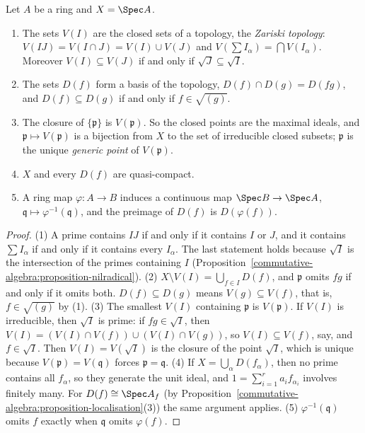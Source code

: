 \begin{proposition}\label{schemes:proposition-spec-topology}
Let $A$ be a ring and $X = \Spec A$.
\begin{enumerate}
\item The sets $V(I)$ are the closed sets of a topology, the \emph{Zariski topology}: $V(IJ) = V(I \cap J) = V(I) \cup V(J)$ and
$V(\sum I_\alpha) = \bigcap V(I_\alpha)$. Moreover $V(I) \subseteq V(J)$ if and only if $\sqrt J \subseteq \sqrt I$.
\item The sets $D(f)$ form a basis of the topology, $D(f) \cap D(g) = D(fg)$, and $D(f) \subseteq D(g)$ if and only if $f \in \sqrt{(g)}$.
\item The closure of $\{\mathfrak{p}\}$ is $V(\mathfrak{p})$. So the closed points are the maximal ideals, and $\mathfrak{p} \mapsto V(\mathfrak{p})$ is a bijection
from $X$ to the set of irreducible closed subsets; $\mathfrak{p}$ is the unique \emph{generic point} of $V(\mathfrak{p})$.
\item $X$ and every $D(f)$ are quasi-compact.
\item A ring map $\varphi \colon A \to B$ induces a continuous map $\Spec B \to \Spec A$, $\mathfrak{q} \mapsto \varphi^{-1}(\mathfrak{q})$, and the preimage
of $D(f)$ is $D(\varphi(f))$.
\end{enumerate}
\end{proposition}

\begin{proof}
(1) A prime contains $IJ$ if and only if it contains $I$ or $J$, and it contains $\sum I_\alpha$ if and only if it contains every $I_\alpha$. The last
statement holds because $\sqrt I$ is the intersection of the primes containing $I$
(Proposition~\ref{commutative-algebra:proposition-nilradical}). (2) $X \setminus V(I) = \bigcup_{f \in I}D(f)$, and $\mathfrak{p}$ omits $fg$ if and
only if it omits both. $D(f) \subseteq D(g)$ means $V(g) \subseteq V(f)$, that is, $f \in \sqrt{(g)}$ by (1). (3) The smallest $V(I)$ containing
$\mathfrak{p}$ is $V(\mathfrak{p})$. If $V(I)$ is irreducible, then $\sqrt I$ is prime: if $fg \in \sqrt I$, then $V(I) = (V(I) \cap V(f)) \cup (V(I) \cap V(g))$,
so $V(I) \subseteq V(f)$, say, and $f \in \sqrt I$. Then $V(I) = V(\sqrt I)$ is the closure of the point $\sqrt I$, which is unique because
$V(\mathfrak{p}) = V(\mathfrak{q})$ forces $\mathfrak{p} = \mathfrak{q}$. (4) If $X = \bigcup_\alpha D(f_\alpha)$, then no prime contains all $f_\alpha$, so they
generate the unit ideal, and $1 = \sum_{i=1}^ra_if_{\alpha_i}$ involves finitely many. For $D(f) \cong \Spec A_f$ (by
Proposition~\ref{commutative-algebra:proposition-localisation}(3)) the same argument applies. (5) $\varphi^{-1}(\mathfrak{q})$ omits $f$ exactly when
$\mathfrak{q}$ omits $\varphi(f)$.
\end{proof}

